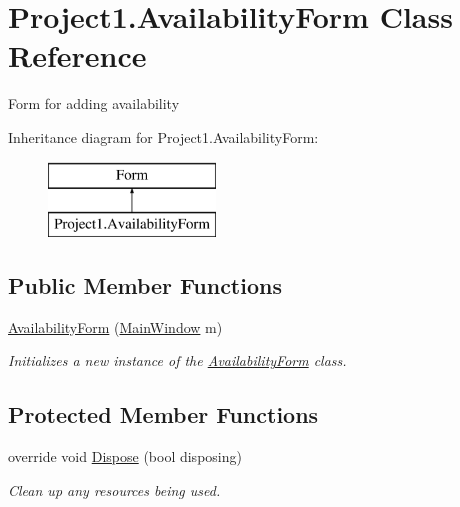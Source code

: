 \hypertarget{classProject1_1_1AvailabilityForm}{}\section{Project1.\+Availability\+Form Class Reference}
\label{classProject1_1_1AvailabilityForm}


Form for adding availability  


Inheritance diagram for Project1.\+Availability\+Form\+:\begin{figure}[H]
\begin{center}
\leavevmode
\includegraphics[height=2.000000cm]{classProject1_1_1AvailabilityForm}
\end{center}
\end{figure}
\subsection*{Public Member Functions}
\begin{DoxyCompactItemize}
\item 
\hyperlink{classProject1_1_1AvailabilityForm_af98972a7bdd3aac1c90a011d12e20634}{Availability\+Form} (\hyperlink{classProject1_1_1MainWindow}{Main\+Window} m)
\begin{DoxyCompactList}\small\item\em Initializes a new instance of the \hyperlink{classProject1_1_1AvailabilityForm}{Availability\+Form} class. \end{DoxyCompactList}\end{DoxyCompactItemize}
\subsection*{Protected Member Functions}
\begin{DoxyCompactItemize}
\item 
override void \hyperlink{classProject1_1_1AvailabilityForm_a8f5f4544312a07be4a5c18a0c5f7f57b}{Dispose} (bool disposing)
\begin{DoxyCompactList}\small\item\em Clean up any resources being used. \end{DoxyCompactList}\end{DoxyCompactItemize}
